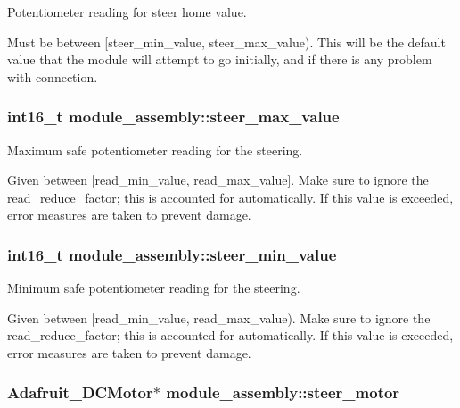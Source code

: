 Potentiometer reading for steer home value. 

Must be between \mbox{[}steer\+\_\+min\+\_\+value, steer\+\_\+max\+\_\+value). This will be the default value that the module will attempt to go initially, and if there is any problem with connection. \hypertarget{structmodule__assembly_a1d3511864da30dc6c827959b5204c5a3}{}
\subsubsection[{steer\+\_\+max\+\_\+value}]{\setlength{\rightskip}{0pt plus 5cm}int16\+\_\+t module\+\_\+assembly\+::steer\+\_\+max\+\_\+value}\label{structmodule__assembly_a1d3511864da30dc6c827959b5204c5a3}


Maximum safe potentiometer reading for the steering. 

Given between \mbox{[}read\+\_\+min\+\_\+value, read\+\_\+max\+\_\+value\mbox{]}. Make sure to ignore the read\+\_\+reduce\+\_\+factor; this is accounted for automatically. If this value is exceeded, error measures are taken to prevent damage. \hypertarget{structmodule__assembly_a55a1e597e4e373ac95a03a32a65a2048}{}
\subsubsection[{steer\+\_\+min\+\_\+value}]{\setlength{\rightskip}{0pt plus 5cm}int16\+\_\+t module\+\_\+assembly\+::steer\+\_\+min\+\_\+value}\label{structmodule__assembly_a55a1e597e4e373ac95a03a32a65a2048}


Minimum safe potentiometer reading for the steering. 

Given between \mbox{[}read\+\_\+min\+\_\+value, read\+\_\+max\+\_\+value). Make sure to ignore the read\+\_\+reduce\+\_\+factor; this is accounted for automatically. If this value is exceeded, error measures are taken to prevent damage. \hypertarget{structmodule__assembly_ace216696d34edd06eef0997f12c35771}{}
\subsubsection[{steer\+\_\+motor}]{\setlength{\rightskip}{0pt plus 5cm}Adafruit\+\_\+\+D\+C\+Motor$\ast$ module\+\_\+assembly\+::steer\+\_\+motor}\label{structmodule__assembly_ace216696d34edd06eef0997f12c35771}


